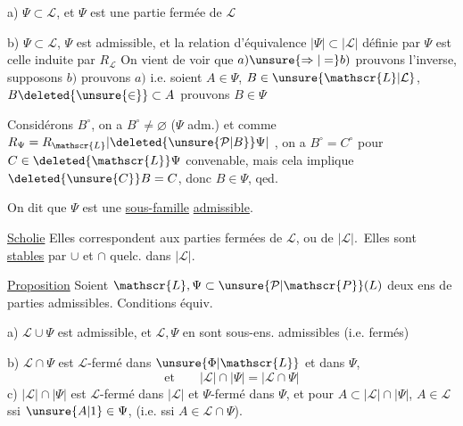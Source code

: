 a) $\Psi\subset\mathscr{L}$, et $\Psi$ est une partie fermée de $\mathscr{L}$

b) $\Psi\subset\mathscr{L}$, $\Psi$ est admissible,  et la relation d'équivalence   $|\Psi|\subset|\mathscr{L}|$ définie par $\Psi$ est celle induite par $R_{\mathscr{L}}$
On vient de voir que $a)\unsure{\Rightarrow|=} b)$ prouvons l'inverse, supposons $b)$ prouvons $a)$ i.e. soient $A\in\Psi$, $B\in\unsure{\mathscr{L}|\mathcal{L}}$, $B\deleted{\unsure{\in}}\subset A$ prouvons $B\in\Psi$

Considérons $B^\circ$, on a $B^\circ\ne\varnothing$ ($\Psi$ adm.) et comme $R_\Psi=R_{\mathscr{L}}\lvert\deleted{\unsure{\mathcal{P}|B}}\Psi\rvert$ , on a $B^\circ=C^\circ$ pour $C\in\deleted{\mathscr{L}}\Psi$ convenable, mais cela implique $\deleted{\unsure{C}}B=C$, donc $B\in\Psi$, qed.

On dit que $\Psi$ est une \uline{sous-famille} \uline{admissible}.

\uline{Scholie} Elles correspondent  aux parties fermées de $\mathscr{L}$, ou de $|\mathscr{L}|$. \unsure{\ensuremath{\Rightarrow}|=}\,Elles sont \uline{stables} par $\cup$ et $\cap$ quelc. dans $|\mathscr{L}|$.

\uline{Proposition} Soient $\mathscr{L},\Psi\subset\unsure{\mathcal{P}|\mathscr{P}}(L)$ deux ens de parties admissibles. Conditions équiv.

a) $\mathscr{L}\cup\Psi$ est admissible, et $\mathscr{L},\Psi$ en sont  sous-ens. admissibles (i.e. fermés)

b) $\mathscr{L}\cap\Psi$ est $\mathscr{L}$-fermé dans $\unsure{\Phi|\mathscr{L}}$ et  dans $\Psi$,
\[
 \text{et}\qquad |\mathscr{L}|\cap|\Psi|=|\mathscr{L}\cap\Psi|
\]
c) $|\mathscr{L}|\cap|\Psi|$ est $\mathscr{L}$-fermé dans $|\mathscr{L}|$ et \unsure{\ensuremath{\{}|,} $\Psi$-fermé dans $\Psi$, et  pour $A\subset|\mathscr{L}|\cap|\Psi|$, $A\in\mathscr{L}$  ssi $\unsure{A|1}\in\Psi$, (i.e. ssi $A\in\mathscr{L}\cap\Psi$).


